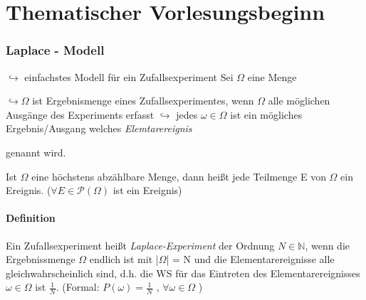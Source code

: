 \documentclass[12pt,a4paper]{article}
\newcommand{\newpara}{\vskip 0.5cm}
\begin{document}
\part{Thematischer Vorlesungsbeginn}
\newpara
\section{Laplace - Modell}
	$\hookrightarrow$ einfachstes Modell für ein Zufallsexperiment
\newpara
	Sei $\Omega$ eine Menge
	\par
	\begingroup
	\leftskip=2cm %
		\noindent $\hookrightarrow \Omega$ ist Ergebnismenge eines Zufallsexperimentes, wenn $\Omega$ alle 
		möglichen Ausgänge des Experiments erfasst \newline
		$\hookrightarrow$ jedes $\omega\in\Omega$ ist ein mögliches Ergebnis/Ausgang welches
 		\textit{Elemtarereignis}
		
		genannt wird. 
	\par
	\endgroup
	Ist $\Omega$ eine höchstens abzählbare Menge, dann heißt jede Teilmenge E  
	von $\Omega$ ein Ereignis. \newline			
	($\forall E\in\mathcal{P}(\Omega)$ ist ein Ereignis)
	\subsection{Definition}
	Ein Zufallsexperiment heißt \textit{Laplace-Experiment} der Ordnung $N\in\mathbb{N}$, wenn die 						Ergebnissmenge $\Omega$ endlich ist mit |$\Omega$| = N und die Elementarereignisse alle 							gleichwahrscheinlich sind, d.h. die WS für das Eintreten des Elementarereignisses $\omega\in\Omega$ ist
	$\frac{1}{N}$. (Formal: 
	$P({\omega}) = \frac{1}{N}$ \space , \space $\forall\omega\in\Omega$ ) 
\end{document}
